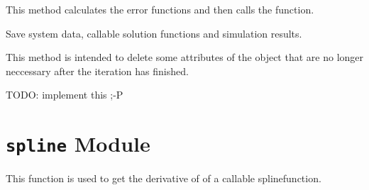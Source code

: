 \documentclass[letterpaper,10pt,english]{sphinxmanual}
\begin{document}
\begin{fulllineitems}
\begin{fulllineitems}
This method calculates the error functions and then calls
the  function.

\end{fulllineitems}


\begin{fulllineitems}
\label{pytrajectory:pytrajectory.trajectory.Trajectory.save}
Save system data, callable solution functions and simulation results.

\end{fulllineitems}


\begin{fulllineitems}
\label{pytrajectory:pytrajectory.trajectory.Trajectory.clear}
This method is intended to delete some attributes of the object that
are no longer neccessary after the iteration has finished.

TODO: implement this ;-P

\end{fulllineitems}


\end{fulllineitems}



\section{\texttt{spline} Module}
\label{pytrajectory:spline-module}\label{pytrajectory:module-pytrajectory.spline}

\begin{fulllineitems}
\label{pytrajectory:pytrajectory.spline.fdiff}
This function is used to get the derivative of of a callable splinefunction.
\begin{quote}\begin{description}
\end{description}\end{quote}

\end{fulllineitems}

\end{document}
